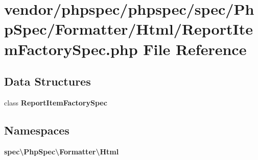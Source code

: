 \section{vendor/phpspec/phpspec/spec/\+Php\+Spec/\+Formatter/\+Html/\+Report\+Item\+Factory\+Spec.php File Reference}
\label{_report_item_factory_spec_8php}
\subsection*{Data Structures}
\begin{DoxyCompactItemize}
\item 
class {\bf Report\+Item\+Factory\+Spec}
\end{DoxyCompactItemize}
\subsection*{Namespaces}
\begin{DoxyCompactItemize}
\item 
 {\bf spec\textbackslash{}\+Php\+Spec\textbackslash{}\+Formatter\textbackslash{}\+Html}
\end{DoxyCompactItemize}
